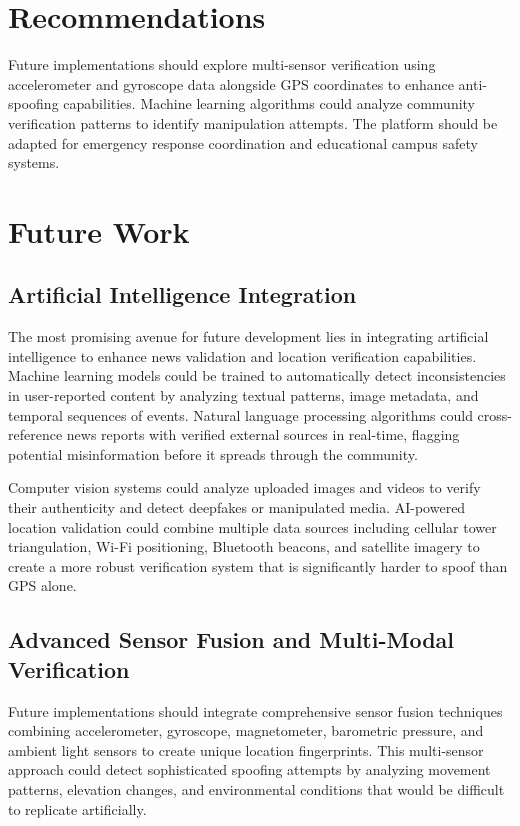 \section{Recommendations}
\label{sec:recommendations}

Future implementations should explore multi-sensor verification using accelerometer and gyroscope data alongside GPS coordinates to enhance anti-spoofing capabilities. Machine learning algorithms could analyze community verification patterns to identify manipulation attempts. The platform should be adapted for emergency response coordination and educational campus safety systems.

\section{Future Work}
\label{sec:future_work}

\subsection{Artificial Intelligence Integration}
\label{subsec:ai_integration}

The most promising avenue for future development lies in integrating artificial intelligence to enhance news validation and location verification capabilities. Machine learning models could be trained to automatically detect inconsistencies in user-reported content by analyzing textual patterns, image metadata, and temporal sequences of events. Natural language processing algorithms could cross-reference news reports with verified external sources in real-time, flagging potential misinformation before it spreads through the community.

Computer vision systems could analyze uploaded images and videos to verify their authenticity and detect deepfakes or manipulated media. AI-powered location validation could combine multiple data sources including cellular tower triangulation, Wi-Fi positioning, Bluetooth beacons, and satellite imagery to create a more robust verification system that is significantly harder to spoof than GPS alone.

\subsection{Advanced Sensor Fusion and Multi-Modal Verification}
\label{subsec:sensor_fusion}

Future implementations should integrate comprehensive sensor fusion techniques combining accelerometer, gyroscope, magnetometer, barometric pressure, and ambient light sensors to create unique location fingerprints. This multi-sensor approach could detect sophisticated spoofing attempts by analyzing movement patterns, elevation changes, and environmental conditions that would be difficult to replicate artificially.


